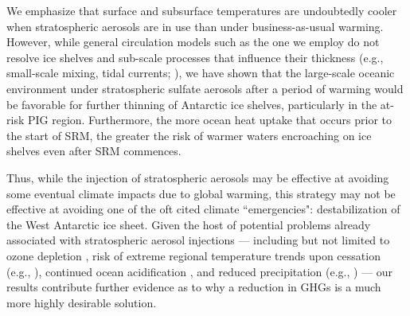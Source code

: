 \documentclass[draft,grl]{AGUTeX}  %
\begin{document}
\begin{article}


We emphasize that surface and subsurface temperatures are undoubtedly cooler when stratospheric aerosols are in use than under business-as-usual warming. However, while general circulation models such as the one we employ do not resolve ice shelves and sub-scale processes that influence their thickness (e.g., small-scale mixing, tidal currents; \cite{joughin11}), we have shown that the large-scale oceanic environment under stratospheric sulfate aerosols after a period of warming would be favorable for further thinning of Antarctic ice shelves, particularly in the at-risk PIG region. Furthermore, the more ocean heat uptake that occurs prior to the start of SRM, the greater the risk of warmer waters encroaching on ice shelves even after SRM commences.

Thus, while the injection of stratospheric aerosols may be effective at avoiding some eventual climate impacts due to global warming, this strategy may not be effective at avoiding one of the oft cited climate ``emergencies": destabilization of the West Antarctic ice sheet. Given the host of potential problems already associated with stratospheric aerosol injections --- including but not limited to ozone depletion \citep{tilmes08,heckendorn09}, risk of extreme regional temperature trends upon cessation (e.g., \cite{mccusker14}), continued ocean acidification \citep{feely04}, and reduced precipitation (e.g., \cite{bala08}) --- our results contribute further evidence as to why a reduction in GHGs is a much more highly desirable solution. %




\end{article}
\end{document}
